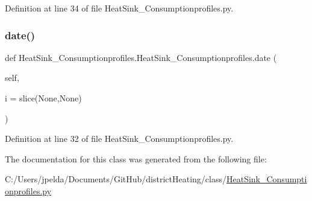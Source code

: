 Definition at line 34 of file Heat\+Sink\+\_\+\+Consumptionprofiles.\+py.

\mbox{\label{class_heat_sink___consumptionprofiles_1_1_heat_sink___consumptionprofiles_a5e52056f8f430a2aa642948af5246a2f}} 
\subsubsection{\texorpdfstring{date()}{date()}}
{\footnotesize\ttfamily def Heat\+Sink\+\_\+\+Consumptionprofiles.\+Heat\+Sink\+\_\+\+Consumptionprofiles.\+date (\begin{DoxyParamCaption}\item[{}]{self,  }\item[{}]{i = {\ttfamily slice(None,None)} }\end{DoxyParamCaption})}



Definition at line 32 of file Heat\+Sink\+\_\+\+Consumptionprofiles.\+py.



The documentation for this class was generated from the following file\+:\begin{DoxyCompactItemize}
\item 
C\+:/\+Users/jpelda/\+Documents/\+Git\+Hub/district\+Heating/class/\hyperlink{_heat_sink___consumptionprofiles_8py}{Heat\+Sink\+\_\+\+Consumptionprofiles.\+py}\end{DoxyCompactItemize}
